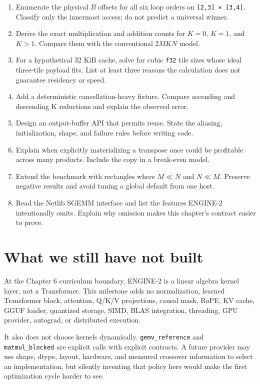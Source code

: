 \begin{enumerate}
\def\labelenumi{\arabic{enumi}.}
\tightlist
\item
  Enumerate the physical \(B\) offsets for all six loop orders on
  \texttt{{[}2,3{]}\ ×\ {[}3,4{]}}. Classify only the innermost access;
  do not predict a universal winner.
\item
  Derive the exact multiplication and addition counts for \(K=0\),
  \(K=1\), and \(K>1\). Compare them with the conventional \(2MKN\)
  model.
\item
  For a hypothetical 32 KiB cache, solve for cubic \texttt{f32} tile
  sizes whose ideal three-tile payload fits. List at least three reasons
  the calculation does not guarantee residency or speed.
\item
  Add a deterministic cancellation-heavy fixture. Compare ascending and
  descending K reductions and explain the observed error.
\item
  Design an output-buffer API that permits reuse. State the aliasing,
  initialization, shape, and failure rules before writing code.
\item
  Explain when explicitly materializing a transpose once could be
  profitable across many products. Include the copy in a break-even
  model.
\item
  Extend the benchmark with rectangles where \(M\ll N\) and \(N\ll M\).
  Preserve negative results and avoid tuning a global default from one
  host.
\item
  Read the Netlib SGEMM interface and list the features ENGINE-2
  intentionally omits. Explain why omission makes this chapter's
  contract easier to prove.
\end{enumerate}

\section{What we still have not
built}\label{what-we-still-have-not-built-1}

At the Chapter 6 curriculum boundary, ENGINE-2 is a linear algebra
kernel layer, not a Transformer. This milestone adds no normalization,
learned Transformer block, attention, Q/K/V projections, causal mask,
RoPE, KV cache, GGUF loader, quantized storage, SIMD, BLAS integration,
threading, GPU provider, autograd, or distributed execution.

It also does not choose kernels dynamically. \texttt{gemv\_reference}
and \texttt{matmul\_blocked} are explicit calls with explicit contracts.
A future provider may use shape, dtype, layout, hardware, and measured
crossover information to select an implementation, but silently
inventing that policy here would make the first optimization cycle
harder to see.

